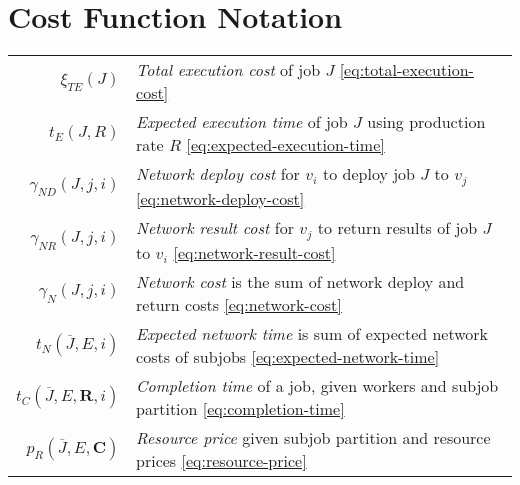 \documentclass[../mthe-493-project-proposal.tex]{subfiles}
\begin{document}
    \section*{Cost Function Notation}
    \begin{tabular}{rl}
    \(\xi_{TE}(J)\) & \textit{Total execution cost} of job \(J\) \eqref{eq:total-execution-cost} \\
    \(t_E(J, R)\) & \textit{Expected execution time} of job \(J\) using production rate \(R\) \eqref{eq:expected-execution-time} \\
    \(\gamma_{ND}(J, j, i)\) & \textit{Network deploy cost} for \(v_i\) to deploy job \(J\) to \(v_j\) \eqref{eq:network-deploy-cost} \\
    \(\gamma_{NR}(J, j, i)\) & \textit{Network result cost} for \(v_j\) to return results of job \(J\) to \(v_i\) \eqref{eq:network-result-cost} \\
    \(\gamma_N(J, j, i)\) & \textit{Network cost} is the sum of network deploy and return costs \eqref{eq:network-cost} \\
    \(t_N(\overline{J}, E, i)\) & \textit{Expected network time} is sum of expected network costs of subjobs \eqref{eq:expected-network-time} \\
    \(t_C(\overline{J}, E, \mathbf{R}, i)\) & \textit{Completion time} of a job, given workers and subjob partition \eqref{eq:completion-time} \\
    \(p_R(\overline{J}, E, \mathbf{C})\) & \textit{Resource price} given subjob partition and resource prices \eqref{eq:resource-price} \\
    \end{tabular}
\end{document}
